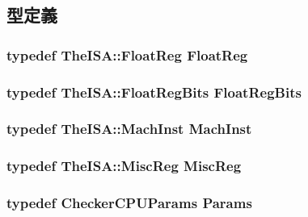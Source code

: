 \subsection{型定義}
\hypertarget{classCheckerCPU_a75484259f1855aabc8d74c6eb1cfe186}{
\subsubsection[{FloatReg}]{\setlength{\rightskip}{0pt plus 5cm}typedef TheISA::FloatReg {\bf FloatReg}}}
\label{classCheckerCPU_a75484259f1855aabc8d74c6eb1cfe186}
\hypertarget{classCheckerCPU_aab5eeae86499f9bfe15ef79360eccc64}{
\subsubsection[{FloatRegBits}]{\setlength{\rightskip}{0pt plus 5cm}typedef TheISA::FloatRegBits {\bf FloatRegBits}}}
\label{classCheckerCPU_aab5eeae86499f9bfe15ef79360eccc64}
\hypertarget{classCheckerCPU_a4617f528417b8f55f809ae0988284c9b}{
\subsubsection[{MachInst}]{\setlength{\rightskip}{0pt plus 5cm}typedef TheISA::MachInst {\bf MachInst}}}
\label{classCheckerCPU_a4617f528417b8f55f809ae0988284c9b}
\hypertarget{classCheckerCPU_aaf5f073a387db0556d1db4bcc45428bc}{
\subsubsection[{MiscReg}]{\setlength{\rightskip}{0pt plus 5cm}typedef TheISA::MiscReg {\bf MiscReg}}}
\label{classCheckerCPU_aaf5f073a387db0556d1db4bcc45428bc}
\hypertarget{classCheckerCPU_a56bf98a1e02b979e88cbf64420995961}{
\subsubsection[{Params}]{\setlength{\rightskip}{0pt plus 5cm}typedef CheckerCPUParams {\bf Params}}}
\label{classCheckerCPU_a56bf98a1e02b979e88cbf64420995961}


